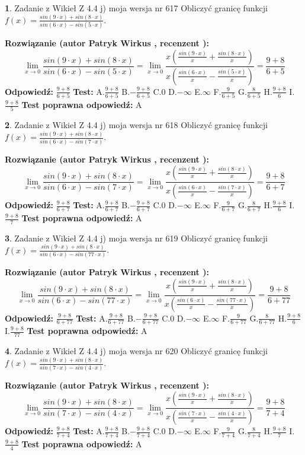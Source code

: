 \documentclass[12pt, a4paper]{article}
\theoremstyle{definition} %
\newtheorem{zad}{}
\newcommand{\zadStart}[1]{\begin{zad}#1\newline}
\newcommand{\zadStop}{\end{zad}}
\newcommand{\rozwStart}[2]{\noindent \textbf{Rozwiązanie (autor #1 , recenzent #2): }\newline}
\newcommand{\rozwStop}{\newline}
\newcommand{\odpStart}{\noindent \textbf{Odpowiedź:}\newline}
\newcommand{\odpStop}{\newline}
\newcommand{\testStart}{\noindent \textbf{Test:}\newline}
\newcommand{\testStop}{\newline}
\newcommand{\kluczStart}{\noindent \textbf{Test poprawna odpowiedź:}\newline}
\newcommand{\kluczStop}{\newline}
\begin{document}
\zadStart{Zadanie z Wikieł Z 4.4 j) moja wersja nr 617}
Obliczyć granicę funkcji $f(x)=\frac{sin(9\cdot x) +sin(8\cdot x)}{sin(6\cdot x) -sin(5\cdot x)}$.
\zadStop
\rozwStart{Patryk Wirkus}{}
$$\lim\limits_{x\to 0}\frac{sin(9\cdot x) +sin(8\cdot x)}{sin(6\cdot x) -sin(5\cdot x)}=\lim\limits_{x\to 0}\frac{x(\frac{sin(9\cdot x)}{x}+\frac{sin(8\cdot x)}{x})}{x(\frac{sin(6\cdot x)}{x}-\frac{sin(5\cdot x)}{x})}=\frac{9+8}{6+5}$$
\rozwStop
\odpStart
$\frac{9+8}{6+5}$
\odpStop
\testStart
A.$\frac{9+8}{6+5}$
B.$-\frac{9+8}{6+5}$
C.$0$
D.$-\infty$
E.$\infty$
F.$\frac{9}{6+5}$
G.$\frac{8}{6+5}$
H.$\frac{9+8}{6}$
I.$\frac{9+8}{5}$
\testStop
\kluczStart
A
\kluczStop



\zadStart{Zadanie z Wikieł Z 4.4 j) moja wersja nr 618}
Obliczyć granicę funkcji $f(x)=\frac{sin(9\cdot x) +sin(8\cdot x)}{sin(6\cdot x) -sin(7\cdot x)}$.
\zadStop
\rozwStart{Patryk Wirkus}{}
$$\lim\limits_{x\to 0}\frac{sin(9\cdot x) +sin(8\cdot x)}{sin(6\cdot x) -sin(7\cdot x)}=\lim\limits_{x\to 0}\frac{x(\frac{sin(9\cdot x)}{x}+\frac{sin(8\cdot x)}{x})}{x(\frac{sin(6\cdot x)}{x}-\frac{sin(7\cdot x)}{x})}=\frac{9+8}{6+7}$$
\rozwStop
\odpStart
$\frac{9+8}{6+7}$
\odpStop
\testStart
A.$\frac{9+8}{6+7}$
B.$-\frac{9+8}{6+7}$
C.$0$
D.$-\infty$
E.$\infty$
F.$\frac{9}{6+7}$
G.$\frac{8}{6+7}$
H.$\frac{9+8}{6}$
I.$\frac{9+8}{7}$
\testStop
\kluczStart
A
\kluczStop



\zadStart{Zadanie z Wikieł Z 4.4 j) moja wersja nr 619}
Obliczyć granicę funkcji $f(x)=\frac{sin(9\cdot x) +sin(8\cdot x)}{sin(6\cdot x) -sin(77\cdot x)}$.
\zadStop
\rozwStart{Patryk Wirkus}{}
$$\lim\limits_{x\to 0}\frac{sin(9\cdot x) +sin(8\cdot x)}{sin(6\cdot x) -sin(77\cdot x)}=\lim\limits_{x\to 0}\frac{x(\frac{sin(9\cdot x)}{x}+\frac{sin(8\cdot x)}{x})}{x(\frac{sin(6\cdot x)}{x}-\frac{sin(77\cdot x)}{x})}=\frac{9+8}{6+77}$$
\rozwStop
\odpStart
$\frac{9+8}{6+77}$
\odpStop
\testStart
A.$\frac{9+8}{6+77}$
B.$-\frac{9+8}{6+77}$
C.$0$
D.$-\infty$
E.$\infty$
F.$\frac{9}{6+77}$
G.$\frac{8}{6+77}$
H.$\frac{9+8}{6}$
I.$\frac{9+8}{77}$
\testStop
\kluczStart
A
\kluczStop



\zadStart{Zadanie z Wikieł Z 4.4 j) moja wersja nr 620}
Obliczyć granicę funkcji $f(x)=\frac{sin(9\cdot x) +sin(8\cdot x)}{sin(7\cdot x) -sin(4\cdot x)}$.
\zadStop
\rozwStart{Patryk Wirkus}{}
$$\lim\limits_{x\to 0}\frac{sin(9\cdot x) +sin(8\cdot x)}{sin(7\cdot x) -sin(4\cdot x)}=\lim\limits_{x\to 0}\frac{x(\frac{sin(9\cdot x)}{x}+\frac{sin(8\cdot x)}{x})}{x(\frac{sin(7\cdot x)}{x}-\frac{sin(4\cdot x)}{x})}=\frac{9+8}{7+4}$$
\rozwStop
\odpStart
$\frac{9+8}{7+4}$
\odpStop
\testStart
A.$\frac{9+8}{7+4}$
B.$-\frac{9+8}{7+4}$
C.$0$
D.$-\infty$
E.$\infty$
F.$\frac{9}{7+4}$
G.$\frac{8}{7+4}$
H.$\frac{9+8}{7}$
I.$\frac{9+8}{4}$
\testStop
\kluczStart
A
\kluczStop
\end{document}
